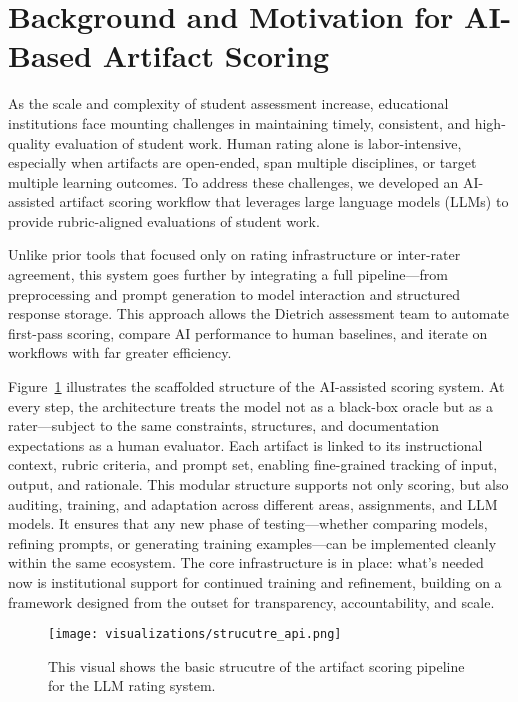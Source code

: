 \documentclass[12pt]{article}%
\begin{document}
\section{Background and Motivation for AI-Based Artifact Scoring}

As the scale and complexity of student assessment increase, educational institutions face mounting challenges in maintaining timely, consistent, and high-quality evaluation of student work. Human rating alone is labor-intensive, especially when artifacts are open-ended, span multiple disciplines, or target multiple learning outcomes. To address these challenges, we developed an AI-assisted artifact scoring workflow that leverages large language models (LLMs) to provide rubric-aligned evaluations of student work.

Unlike prior tools that focused only on rating infrastructure or inter-rater agreement, this system goes further by integrating a full pipeline—from preprocessing and prompt generation to model interaction and structured response storage. This approach allows the Dietrich assessment team to automate first-pass scoring, compare AI performance to human baselines, and iterate on workflows with far greater efficiency.

Figure~\ref{fig:strucutre_api} illustrates the scaffolded structure of the AI-assisted scoring system. At every step, the architecture treats the model not as a black-box oracle but as a rater—subject to the same constraints, structures, and documentation expectations as a human evaluator. Each artifact is linked to its instructional context, rubric criteria, and prompt set, enabling fine-grained tracking of input, output, and rationale. This modular structure supports not only scoring, but also auditing, training, and adaptation across different areas, assignments, and LLM models. It ensures that any new phase of testing—whether comparing models, refining prompts, or generating training examples—can be implemented cleanly within the same ecosystem. The core infrastructure is in place: what’s needed now is institutional support for continued training and refinement, building on a framework designed from the outset for transparency, accountability, and scale.

\begin{figure}[h]
    \centering
    \texttt{[image: visualizations/strucutre\_api.png]}
    \caption{This visual shows the basic strucutre of the artifact scoring pipeline for the LLM rating system.}
    \label{fig:strucutre_api}
\end{figure}
\end{document}

